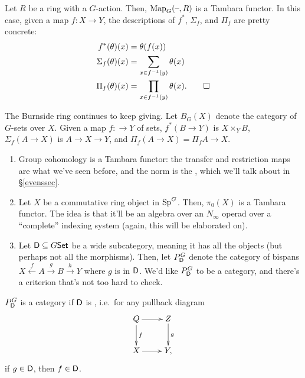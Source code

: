 \begin{exm}
Let $R$ be a ring with a $G$-action. Then, $\operatorname{Map}_G(\text{--},R)$ is a Tambara functor. In this case, given a map $f\colon
X\to Y$, the descriptions of $f^*$, $\Sigma_f$, and $\Pi_f$ are pretty concrete:
\begin{align*}
	f^*(\theta)(x) &= \theta(f(x))\\
	\Sigma_f(\theta)(x) &= \sum_{x\in f^{-1}(y)} \theta(x)\\
	\Pi_f(\theta)(x) &= \prod_{x\in f^{-1}(y)} \theta(x).\qedhere
\end{align*}
\end{exm}
\begin{exm}
The Burnside ring continues to keep giving. Let $B_G(X)$ denote the category of $G$-sets over $X$. Given a map
$f\colon \to Y$ of sets, $f^*(B\to Y)$ is $X\times_Y B$, $\Sigma_f(A\to X)$ is $A\to X\to Y$, and $\Pi_f(A\to X) =
\Pi_fA\to X$.
\end{exm}
\begin{exm}\hfill
\label{Evensexm}
\begin{enumerate}
	\item Group cohomology is a Tambara functor: the transfer and restriction maps are what we've seen before, and
	the norm is the , which we'll talk about in \S\ref{evenssec}.
	\item Let $X$ be a commutative ring object in $\mathrm{Sp}^G$. Then, $\pi_0(X)$ is a Tambara functor. The idea is that
	it'll be an algebra over an $N_\infty$ operad over a ``complete'' indexing system (again, this will be
	elaborated on).
	\item Let $\mathsf D\subseteq G\mathsf{Set}$ be a wide subcategory, meaning it has all the objects (but perhaps not all the
	morphisms). Then, let $P_\mathsf D^G$ denote the category of bispans $X\stackrel f\gets A\stackrel g\to B\stackrel
	h\to Y$ where $g$ is in $\mathsf D$. We'd like $P_\mathsf D^G$ to be a category, and there's a criterion that's not too
	hard to check.\qedhere
\end{enumerate}
\end{exm}
\begin{prop}
$P_\mathsf D^G$ is a category if $\mathsf D$ is , i.e.\ for any pullback diagram
\[\xymatrix{
	Q\ar[r]\ar[d]^f & Z\ar[d]^g\\
	X\ar[r] & Y,
}\]
if $g\in\mathsf D$, then $f\in\mathsf D$.
\end{prop}
